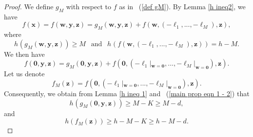 \documentclass[12pt]{amsart}
\theoremstyle{definition}
\theoremstyle{remark}
\numberwithin{equation}{section}
\begin{document}
\begin{proof}
We define $g_M$ with respect to $f$ as in ~(\ref{def gM}).
By Lemma \ref{h ineq2}, we have
\begin{equation}
\label{main prop eqn 2 - 2}
{f}(\mathbf{x}) = f( \mathbf{w}, \mathbf{y}, \mathbf{z}) = g_M( \mathbf{w}, \mathbf{y}, \mathbf{z} ) + {f} (\mathbf{w}, (- \ell_1, ..., -\ell_M), \mathbf{z}),
\end{equation}
where
\begin{equation}
\label{main prop eqn 1 - 2}
h_{  }(g_M( \mathbf{w}, \mathbf{y}, \mathbf{z} ) ) \geq M \ \ \text{ and } \ \ h_{  } ({f} (\mathbf{w}, (- \ell_1, ..., -\ell_M), \mathbf{z})) = h-M.
\end{equation}
We then have
\begin{equation}
\label{gM is 0'}
{f}(\mathbf{0}, \mathbf{y}, \mathbf{z}) = g_M( \mathbf{0}, \mathbf{y}, \mathbf{z} ) + {f} (\mathbf{0}, (- \ell_1 |_{\mathbf{w} = \mathbf{0}}, ..., -\ell_M |_{\mathbf{w} = \mathbf{0}}),  \mathbf{z}).
\end{equation}
Let us denote
$$
f_M(\mathbf{z} ) = {f} (\mathbf{0}, (- \ell_1 |_{\mathbf{w} = \mathbf{0}}, ..., -\ell_M |_{\mathbf{w} = \mathbf{0}}), \mathbf{z}).
$$
Consequently, we obtain from Lemma \ref{h ineq 1} and ~(\ref{main prop eqn 1 - 2}) that
\begin{equation}
\label{h eqn 1}
h_{  }(g_M( \mathbf{0}, \mathbf{y}, \mathbf{z} ) ) \geq M-K \geq M-d,
\end{equation}
and
\begin{equation}
\label{h eqn 2}
h ( f_M(\mathbf{z} ) ) \geq h - M - K \geq h- M- d.
\end{equation}


\end{proof}
\end{document}
